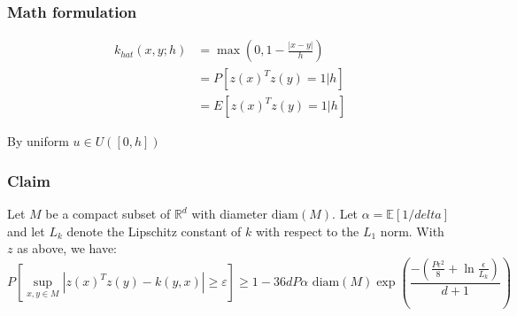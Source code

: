 \begin{frame}
    \frametitle{Math formulation }
    \begin{align}
        k_{hat}(x, y; h)
        & = 
        \max 
        \left(
        0,
        1 - \frac{|x-y|}{h}
        \right)  
        \\
        & = P\left[
        z(x)^T z(y) = 1 | h
    \right]
    \\
        & =
        E\left[
        z(x)^T z(y) = 1 | h
    \right]
    \end{align}

    By uniform $u \in U([0,h])$
    

\end{frame}

\begin{frame}
    \frametitle{Claim}
\begin{theorem}
        Let $M$ be a compact subset of $\mathbb{R}^d$ with diameter $\text{diam}(M)$. Let $\alpha = \mathbb{E}[1/delta]$ and let $L_k$ denote the Lipschitz constant of $k$ with respect to the $L_1$ norm. With $z$ as above, we have:
        \begin{equation}
            P \left[
                \sup_{x,y \in M} |z(x)^T z(y) - k(y,x)|
                \geq \varepsilon
            \right]
            \geq
            1 - 36 d P \alpha
            \text{ diam}(M)
            \exp\left(
                \frac{
                    - 
                    \left( 
                        \frac{P \epsilon^2}{8}
                        +
                        \ln \frac{\epsilon}{L_k}
                    \right)
                }{d +1 }
            \right)
        \end{equation}
    \end{theorem}

\end{frame}


